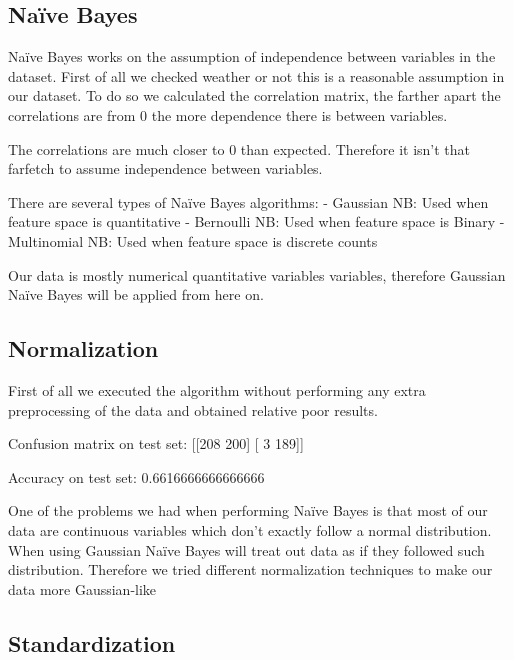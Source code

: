 
\subsection{Na\"ive Bayes}%
\label{sub:naive-bayes}



Na\"ive Bayes works on the assumption of independence between variables in the dataset. First of all we checked weather or not this is a reasonable assumption in our dataset. To do so we calculated the correlation matrix, the farther apart the correlations are from 0 the more dependence there is between variables.


The correlations are much closer to 0 than expected. Therefore it isn't that farfetch to assume independence
between variables.

There are several types of Na\"ive Bayes algorithms:
    - Gaussian NB: Used when feature space is quantitative
    - Bernoulli NB: Used when feature space is Binary
    - Multinomial NB: Used when feature space is discrete counts

Our data is mostly numerical quantitative variables variables, therefore Gaussian Na\"ive Bayes will be applied from here on.

\subsection{Normalization}

First of all we executed the algorithm without performing any extra preprocessing of the data and obtained
relative poor results.

Confusion matrix on test set:
 [[208 200]
 [  3 189]]

Accuracy on test set:  0.6616666666666666


One of the problems we had when performing Na\"ive Bayes is that most of our data are continuous variables
which don't exactly follow a normal distribution. When using Gaussian Na\"ive Bayes will treat out data 
as if they followed such distribution. Therefore we tried different normalization techniques to make our
data more Gaussian-like

\subsection{Standardization}


